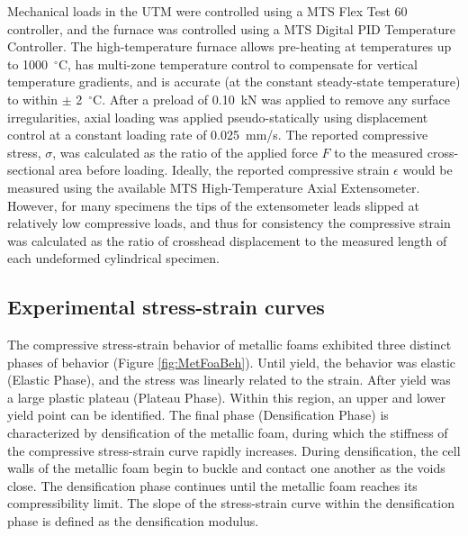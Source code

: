 \documentclass[review]{elsarticle}
\begin{document}
Mechanical loads in the UTM were controlled using a MTS Flex Test 60 controller, and the furnace was controlled using a MTS Digital PID Temperature Controller. The high-temperature furnace allows pre-heating at temperatures up to 1000~$^\circ\mathrm{C}$, has multi-zone temperature control to compensate for vertical temperature gradients, and is accurate (at the constant steady-state temperature) to within $\pm$ 2~$^\circ\mathrm{C}$. After a preload of 0.10~kN was applied to remove any surface irregularities, axial loading was applied pseudo-statically using displacement control at a constant loading rate of 0.025~mm/s. The reported compressive stress, $\sigma$, was calculated as the ratio of the applied force $F$ to the measured cross-sectional area before loading. Ideally, the reported compressive strain $\epsilon$ would be measured using the available MTS High-Temperature Axial Extensometer. However, for many specimens the tips of the extensometer leads slipped at relatively low compressive loads, and thus for consistency the compressive strain was calculated as the ratio of crosshead displacement to the measured length of each undeformed cylindrical specimen.

\subsection{Experimental stress-strain curves}

The compressive stress-strain behavior of metallic foams exhibited three distinct phases of behavior (Figure \ref{fig:MetFoaBeh}). Until yield, the behavior was elastic (Elastic Phase), and the stress was linearly related to the strain. After yield was a large plastic plateau (Plateau Phase). Within this region, an upper and lower yield point can be identified. The final phase (Densification Phase) is characterized by densification of the metallic foam, during which the stiffness of the compressive stress-strain curve rapidly increases. During densification, the cell walls of the metallic foam begin to buckle and contact one another as the voids close. The densification phase continues until the metallic foam reaches its compressibility limit. The slope of the stress-strain curve within the densification phase is defined as the densification modulus.
\end{document}
